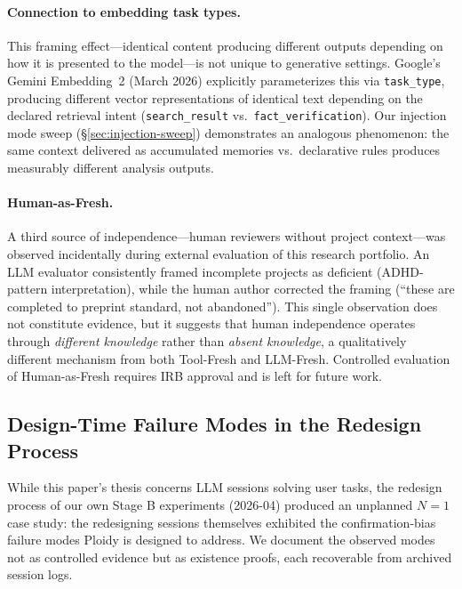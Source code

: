 \documentclass[11pt]{article}
\begin{document}
\paragraph{Connection to embedding task types.}
This framing effect---identical content producing different outputs depending on how it is presented to the model---is not unique to generative settings. Google's Gemini Embedding~2 (March 2026) explicitly parameterizes this via \texttt{task\_type}, producing different vector representations of identical text depending on the declared retrieval intent (\texttt{search\_result} vs.\ \texttt{fact\_verification}). Our injection mode sweep (\S\ref{sec:injection-sweep}) demonstrates an analogous phenomenon: the same context delivered as accumulated memories vs.\ declarative rules produces measurably different analysis outputs.

\paragraph{Human-as-Fresh.}
A third source of independence---human reviewers without project context---was observed incidentally during external evaluation of this research portfolio. An LLM evaluator consistently framed incomplete projects as deficient (ADHD-pattern interpretation), while the human author corrected the framing (``these are completed to preprint standard, not abandoned''). This single observation does not constitute evidence, but it suggests that human independence operates through \emph{different knowledge} rather than \emph{absent knowledge}, a qualitatively different mechanism from both Tool-Fresh and LLM-Fresh. Controlled evaluation of Human-as-Fresh requires IRB approval and is left for future work.

\subsection{Design-Time Failure Modes in the Redesign Process}
\label{sec:design-time-failures}

While this paper's thesis concerns LLM sessions solving user tasks, the
redesign process of our own Stage B experiments (2026-04) produced an
unplanned $N=1$ case study: the redesigning sessions themselves exhibited
the confirmation-bias failure modes Ploidy is designed to address. We
document the observed modes not as controlled evidence but as existence
proofs, each recoverable from archived session logs.
\end{document}
